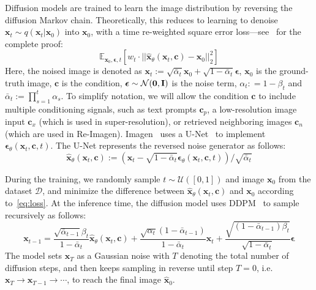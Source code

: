 \documentclass{article} \usepackage{iclr2023_conference,times}
\newcommand{\modelname}{{Re-Imagen}\xspace}
\begin{document}
Diffusion models are trained to learn the image distribution by reversing the diffusion Markov chain. Theoretically, this reduces to learning to denoise $\bm{x}_t \sim q(\bm{x}_t|\bm{x}_0)$ into $\bm{x}_0$, with a time re-weighted square error loss---see~\cite{ho2020denoising} for the complete proof:
\begin{equation}
\label{eq:loss}
    \mathbb{E}_{\bm{x}_0, \bm{\epsilon}, t} [w_t \cdot ||\hat{\bm{x}}_{\theta}(\bm{x}_t, \bm{c}) - \bm{x}_0||_2^2]
\end{equation}
Here, the noised image is denoted as $\bm{x}_t := \sqrt{\bar{\alpha}_t} \bm{x}_0 + \sqrt{1-\bar{\alpha}_t} \bm{\epsilon}$, $\bm{x}_0$ is the ground-truth image, $\bm{c}$ is the condition, $\bm{\epsilon} \sim \mathcal{N}(\bf{0}, I)$ is the noise term, $\alpha_t: = 1 - \beta_t$ and $\bar{\alpha}_t := \prod_{s=1}^t \alpha_s$. To simplify notation, we will allow the condition $\bm{c}$ to include multiple conditioning signals, such as text prompts $\bm{c}_p$, a low-resolution image input $\bm{c}_x$ (which is used in super-resolution), or retrieved neighboring images $\bm{c}_n$ (which are used in \modelname).  Imagen~\citep{saharia2022photorealistic} uses a U-Net~\citep{ronneberger2015u} to implement $\bm{\epsilon}_{\theta}(\bm{x}_{t},  \bm{c}, t)$. The U-Net represents the reversed noise generator as follows:
\begin{equation}
\label{eq:recover_original}
    \hat{\bm{x}}_{\theta}(\bm{x}_t, \bm{c}) := (\bm{x}_t - \sqrt{1 - \bar{\alpha}_t} \bm{\epsilon}_{\theta}(\bm{x}_{t}, \bm{c}, t)) / \sqrt{\bar{\alpha}_t}
\end{equation}

During the training, we randomly sample $t \sim \mathcal{U}([0, 1])$ and image $\bm{x}_0$ from the dataset $\mathcal{D}$, and minimize the difference between $\hat{\bm{x}}_{\theta}(\bm{x}_t, \bm{c})$ and $\bm{x}_0$ according to~\autoref{eq:loss}. At the inference time, the diffusion model uses DDPM~\citep{ho2020denoising} to sample recursively as follows:
\begin{equation}
    \bm{x}_{t-1} = \frac{\sqrt{\bar{\alpha}_{t-1}} \beta_t}{1 - \bar{\alpha}_t} \hat{\bm{x}}_{\theta}(\bm{x}_t, \bm{c}) + \frac{\sqrt{\alpha_t}(1- \bar{\alpha}_{t-1})}{1 - \bar{\alpha}_t}\bm{x}_t + \frac{\sqrt{(1 - \bar{\alpha}_{t-1})\beta_t}}{\sqrt{1 - \bar{\alpha}_t}} \bm{\epsilon}
\end{equation}
The model sets $\bm{x}_T$ as a Gaussian noise with $T$ denoting the total number of diffusion steps, and then keeps sampling in reverse until step $T=0$, i.e. $\bm{x}_{T} \rightarrow \bm{x}_{T-1} \rightarrow \cdots$,  to reach the final image $\hat{\bm{x}}_0$.
\end{document}
